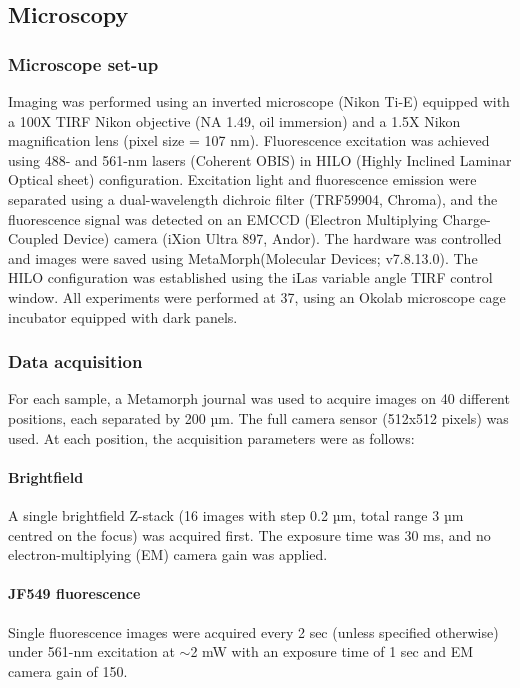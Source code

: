 \subsection*{Microscopy}
\subsubsection*{Microscope set-up}
Imaging was performed using an inverted microscope (Nikon Ti-E) equipped with a 100X TIRF Nikon objective (NA 1.49, oil immersion) and a 1.5X Nikon magnification lens (pixel size = 107 nm). Fluorescence excitation was achieved using 488- and 561-nm lasers (Coherent OBIS) in HILO (Highly Inclined Laminar Optical sheet) configuration. Excitation light and fluorescence emission were separated using a dual-wavelength dichroic filter (TRF59904, Chroma), and the fluorescence signal was detected on an EMCCD (Electron Multiplying Charge-Coupled Device) camera (iXion Ultra 897, Andor). The hardware was controlled and images were saved using MetaMorph(Molecular Devices; v7.8.13.0). The HILO configuration was established using the iLas variable angle TIRF control window. All experiments were performed at 37\celsius, using an Okolab microscope cage incubator equipped with dark panels.

\subsubsection*{Data acquisition}
For each sample, a Metamorph journal was used to acquire images on 40 different positions, each separated by 200 µm. The full camera sensor (512x512 pixels) was used. At each position, the acquisition parameters were as follows:

\paragraph{Brightfield} A single brightfield Z-stack (16 images with step 0.2 µm, total range 3 µm centred on the focus) was acquired first. The exposure time was 30 ms, and no electron-multiplying (EM) camera gain was applied.

\paragraph{JF549 fluorescence} Single fluorescence images were acquired every 2 sec (unless specified otherwise) under 561-nm excitation at $\sim$2 mW with an exposure time of 1 sec and EM camera gain of 150.


